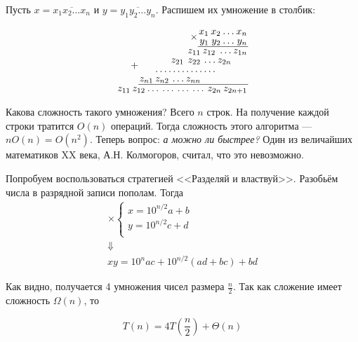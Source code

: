 \documentclass[a4paper,12pt]{article}
\begin{document}
Пусть \(x = \overline{x_1 x_2 \ldots x_n}\) и \(y = \overline{y_1 y_2 \ldots y_n}\). Распишем их умножение в столбик:
\begin{center}
	\[
	\renewcommand{\arraystretch}{0.8}
	\arraycolsep=1pt
	\begin{array}{r}
	\times\begin{array}{rrrr}
	x_1 & x_2 & \ldots & x_n \\
	y_1 & y_2 & \ldots & y_n \\
	\hline
	\end{array}
	\\
	+\begin{array}{rrrrrrr}
	& & & z_{11} & z_{12} & \ldots & z_{1n} \\
	& & z_{21} & z_{22} & \ldots & z_{2n} & \\
	& \hdotsfor{4} & & \\
	z_{n1} & z_{n2} & \ldots & z_{nn} & & & \\
	\hline
	\end{array}
	\\
	\begin{array}{rrrrrrrr}
	z_{11} & z_{12} & \dots & \dots & \dots & \dots & z_{2n} & z_{2n+1} \\
	\end{array}
	\end{array}\]
\end{center}


Какова сложность такого умножения? Всего \(n\) строк. На получение каждой строки тратится \(O(n)\) операций. Тогда сложность этого алгоритма --- \(nO(n) = O(n^2)\). Теперь вопрос: \emph{а можно ли быстрее?} Один из величайших математиков XX века, А.Н. Колмогоров, считал, что это невозможно.

Попробуем воспользоваться стратегией <<Разделяй и властвуй>>. Разобьём числа в разрядной записи пополам. Тогда
\[\begin{array}{c}
\times \begin{cases}
x = 10^{n/2}a + b\\
y = 10^{n/2}c + d\\
\end{cases} \\
\Downarrow\\
xy = 10^{n}ac + 10^{n/2}(ad+bc)+bd
\end{array}\]

Как видно, получается 4 умножения чисел размера \(\frac{n}{2}\). Так как сложение имеет сложность \(\Omega(n)\), то

\[T(n) = 4T\left( \frac{n}{2} \right) + \Theta(n)\]
\end{document}
